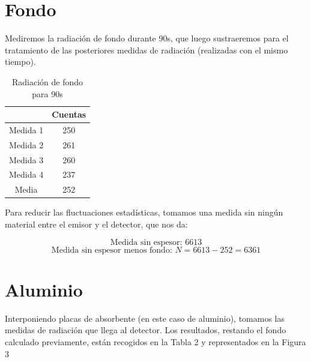 \documentclass[a4paper,12pt,spanish]{article}
\begin{document}
	
	
	\section{Fondo}
	
	Mediremos la radiación de fondo durante 90s, que luego sustraeremos para el tratamiento de las posteriores medidas de radiación (realizadas con el mismo tiempo).
	
	\begin{table}[H]
		\centering
		\begin{tabular}{c|c|}
			\cline{2-2}
			& Cuentas \\ \hline
			\multicolumn{1}{|c|}{Medida 1 } & 250     \\ \hline
			\multicolumn{1}{|c|}{Medida 2} & 261     \\ \hline
			\multicolumn{1}{|c|}{Medida 3} & 260     \\ \hline
			\multicolumn{1}{|c|}{Medida 4} & 237     \\ \hline\hline
			\multicolumn{1}{|c|}{Media}    & 252     \\ \hline
		\end{tabular}
	\caption{Radiación de fondo para 90s}
	\end{table}

Para reducir las fluctuaciones estadísticas, tomamos una medida sin ningún material entre el emisor y el detector, que nos da:
	
	\[ \text{Medida sin espesor: 6613} 
	\]
	\[ \text{Medida sin espesor menos fondo: } N = 6613 - 252 = 6361
	\]
	

	\section{Aluminio}
	
	
	
	
	Interponiendo placas de absorbente (en este caso de aluminio), tomamos las medidas de radiación que llega al detector. Los resultados, restando el fondo calculado previamente, están recogidos en la Tabla 2 y representados en la Figura 3
	
	
		
\end{document}
